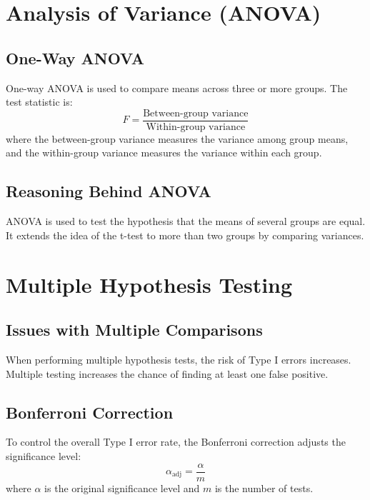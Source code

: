 \documentclass{article}
\begin{document}
\section{Analysis of Variance (ANOVA)}

\subsection{One-Way ANOVA}
One-way ANOVA is used to compare means across three or more groups. The test statistic is:
\begin{equation}
F = \frac{\text{Between-group variance}}{\text{Within-group variance}}
\end{equation}
where the between-group variance measures the variance among group means, and the within-group variance measures the variance within each group.

\subsection{Reasoning Behind ANOVA}
ANOVA is used to test the hypothesis that the means of several groups are equal. It extends the idea of the t-test to more than two groups by comparing variances.

\section{Multiple Hypothesis Testing}

\subsection{Issues with Multiple Comparisons}
When performing multiple hypothesis tests, the risk of Type I errors increases. Multiple testing increases the chance of finding at least one false positive.

\subsection{Bonferroni Correction}
To control the overall Type I error rate, the Bonferroni correction adjusts the significance level:
\begin{equation}
\alpha_{\text{adj}} = \frac{\alpha}{m}
\end{equation}
where $\alpha$ is the original significance level and $m$ is the number of tests.
\end{document}
